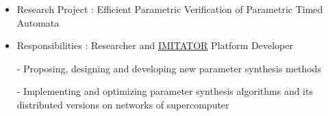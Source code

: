 \documentclass[10pt,a4paper,ragged2e]{altacv}
\begin{document}
	
	
	\divider
	
	
%		
	\begin{itemize}
		\item Research Project : Efficient Parametric Verification of Parametric Timed Automata
		\item Responsibilities : Researcher and \href{https://www.imitator.fr/}{IMITATOR} Platform Developer
		
		- Proposing, designing and developing new parameter synthesis methods
		
		- Implementing and optimizing parameter synthesis algorithms and its distributed versions on networks of supercomputer
	\end{itemize}
	
	
	\divider
	
\end{document}
